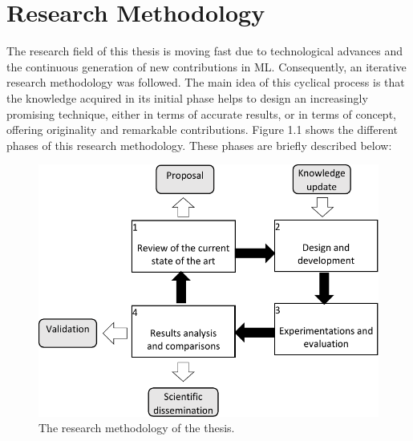 



\section{Research Methodology}
\label{sec:1_3_automl_and_tf}
The research field of this thesis is moving fast due to technological advances and the continuous generation of new contributions in ML. Consequently, an iterative research methodology was followed. The main idea of this cyclical process is that the knowledge acquired in its initial phase helps to design an increasingly promising technique,
either in terms of accurate results, or in terms of concept, offering originality and remarkable contributions. Figure 1.1 shows the different phases of this research methodology.
These phases are briefly described below:

\begin{figure}[!ht]
    \centering
    \includegraphics[width=.8\textwidth]{1_introduction/figures/fig_research-methodo.pdf}
    \caption{The research methodology of the thesis.}
    \label{ch1:research-emthodo}
\end{figure}

